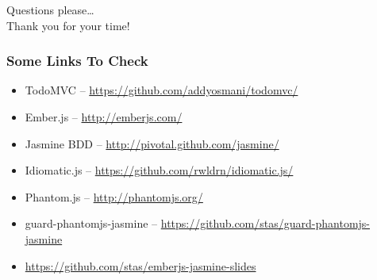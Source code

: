 \documentclass[compress]{beamer}
\begin{document}
\begin{frame}
  \begin{center}
  \huge Questions please\ldots
  \\
  Thank you for your time!
  \end{center}
\end{frame}

\begin{frame}
\frametitle{Some Links To Check}

\begin{itemize}
  \item TodoMVC -- \url{https://github.com/addyosmani/todomvc/}
  \item Ember.js -- \url{http://emberjs.com/}
  \item Jasmine BDD -- \url{http://pivotal.github.com/jasmine/}
  \item Idiomatic.js -- \url{https://github.com/rwldrn/idiomatic.js/}
  \item Phantom.js -- \url{http://phantomjs.org/}
  \item guard-phantomjs-jasmine -- \url{https://github.com/stas/guard-phantomjs-jasmine}
  \item \url{https://github.com/stas/emberjs-jasmine-slides}
\end{itemize}

\end{frame}
\end{document}
